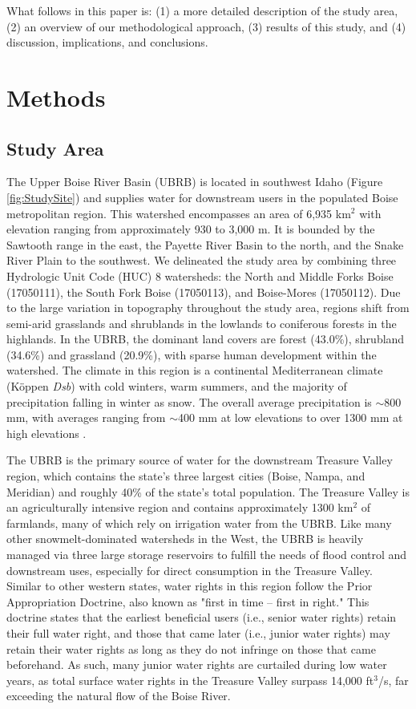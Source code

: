 \documentclass[11pt,letterpaper]{article}
\begin{document}
What follows in this paper is: (1) a more detailed description of the study area, (2) an overview of our methodological approach, (3) results of this study, and (4) discussion, implications, and conclusions. 

\section{Methods}
\subsection{Study Area}
The Upper Boise River Basin (UBRB) is located in southwest Idaho (Figure \ref{fig:StudySite}) and supplies water for downstream users in the populated Boise metropolitan region. This watershed encompasses an area of 6,935 km${}^2$ with elevation ranging from approximately 930 to 3,000 m. It is bounded by the Sawtooth range in the east, the Payette River Basin to the north, and the Snake River Plain to the southwest. We delineated the study area by combining three Hydrologic Unit Code (HUC) 8 watersheds: the North and Middle Forks Boise (17050111), the South Fork Boise (17050113), and Boise-Mores (17050112). Due to the large variation in topography throughout the study area, regions shift from semi-arid grasslands and shrublands in the lowlands to coniferous forests in the highlands. In the UBRB, the dominant land covers are forest (43.0\%), shrubland (34.6\%) and grassland (20.9\%), with sparse human development within the watershed. The climate in this region is a continental Mediterranean climate (K\"{o}ppen \textit{Dsb}) with cold winters, warm summers, and the majority of precipitation falling in winter as snow. The overall average precipitation is $\sim$800 mm, with averages ranging from $\sim$400 mm at low elevations to over 1300 mm at high elevations \citep{Daly:2008hsa}.

The UBRB is the primary source of water for the downstream Treasure Valley region, which contains the state's three largest cities (Boise, Nampa, and Meridian) and roughly 40\% of the state's total population. The Treasure Valley is an agriculturally intensive region and contains approximately 1300 km${}^2$ of farmlands, many of which rely on irrigation water from the UBRB.  Like many other snowmelt-dominated watersheds in the West, the UBRB is heavily managed via three large storage reservoirs to fulfill the needs of flood control and downstream uses, especially for direct consumption in the Treasure Valley. Similar to other western states, water rights in this region follow the Prior Appropriation Doctrine, also known as "first in time – first in right." This doctrine states that the earliest beneficial users (i.e., senior water rights) retain their full water right, and those that came later (i.e., junior water rights) may retain their water rights as long as they do not infringe on those that came beforehand. As such, many junior water rights are curtailed during low water years, as total surface water rights in the Treasure Valley surpass 14,000 ft${}^3$/s, far exceeding the natural flow of the Boise River.
\end{document}
